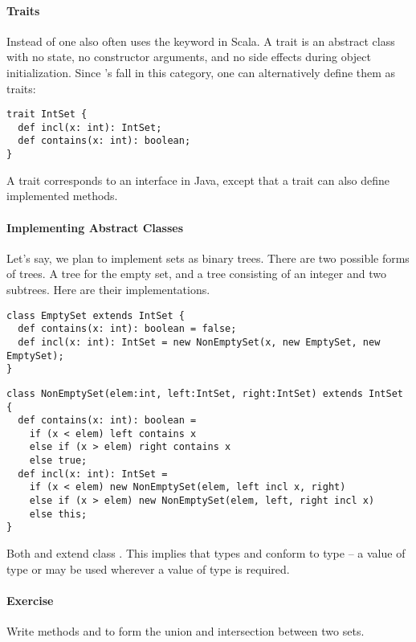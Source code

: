 \documentclass[a4paper,12pt,twoside,titlepage]{book}
\newcommand{\exercise}{\paragraph{Exercise}}
\begin{document}
\paragraph{Traits}

Instead of  one also often uses the keyword
 in Scala. A trait is an abstract class with no state, no
constructor arguments, and no side effects during object
initialization.  Since 's fall in this category, one can
alternatively define them as traits:
\begin{lstlisting}
trait IntSet {
  def incl(x: int): IntSet;
  def contains(x: int): boolean;
}
\end{lstlisting}
A trait corresponds to an interface in Java, except
that a trait can also define implemented methods.  

\paragraph{Implementing Abstract Classes}

Let's say, we plan to implement sets as binary trees.  There are two
possible forms of trees. A tree for the empty set, and a tree
consisting of an integer and two subtrees. Here are their
implementations.

\begin{lstlisting}
class EmptySet extends IntSet {
  def contains(x: int): boolean = false;
  def incl(x: int): IntSet = new NonEmptySet(x, new EmptySet, new EmptySet);
}
\end{lstlisting}

\begin{lstlisting}
class NonEmptySet(elem:int, left:IntSet, right:IntSet) extends IntSet {
  def contains(x: int): boolean = 
    if (x < elem) left contains x
    else if (x > elem) right contains x
    else true;
  def incl(x: int): IntSet = 
    if (x < elem) new NonEmptySet(elem, left incl x, right)
    else if (x > elem) new NonEmptySet(elem, left, right incl x)
    else this;
}
\end{lstlisting}
Both  and  extend class
.  This implies that types  and
 conform to type  -- a value of type  or  may be used wherever a value of type  is required.

\exercise Write methods  and  to form
the union and intersection between two sets.
\end{document}
